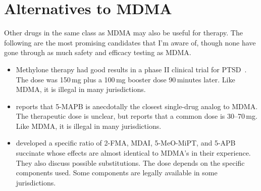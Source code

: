 \documentclass[11pt,oneside]{book}
\let\cite\parencite
\begin{document}
\chapter{Alternatives to MDMA}
Other drugs in the same class as MDMA may also be useful for therapy. The following are the most promising candidates that I'm aware of, though none have gone through as much safety and efficacy testing as MDMA.
\begin{itemize}
    \item Methylone therapy had good results in a phase II clinical trial for PTSD~\cite{methyloneRCT}. The dose was 150\,mg plus a 100\,mg booster dose 90\,minutes later. Like MDMA, it is illegal in many jurisdictions.
    \item \textcite{baggottNewEntactogens} reports that 5-MAPB is anecdotally the closest single-drug analog to MDMA. The therapeutic dose is unclear, but \textcite{erowid5MAPB} reports that a common dose is 30--70\,mg. Like MDMA, it is illegal in many jurisdictions.
    \item \textcite{boraxMDMA} developed a specific ratio of 2-FMA, MDAI, 5-MeO-MiPT, and 5-APB succinate whose effects are almost identical to MDMA's in their experience. They also discuss possible substitutions. The dose depends on the specific components used. Some components are legally available in some jurisdictions.
\end{itemize}

\end{document}
